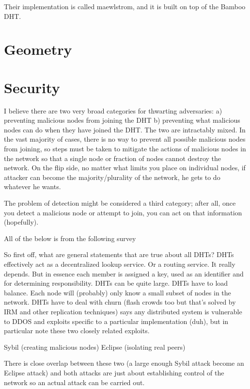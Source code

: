 \documentclass[10pt,letterpaper]{report}
\begin{document}
Their implementation is called maewlstrom, and it is built on top of the Bamboo DHT.



\section{Geometry}


\section{Security}

I believe there are two very broad categories for thwarting adversaries:  a)  preventing malicious nodes from joining the DHT b) preventing what malicious nodes can do when they have joined the DHT.  The two are intractably mixed.  In the vast majority of cases, there is no way to prevent all possible malicious nodes from joining, so steps must be taken to mitigate the actions of malicious nodes in the network so that a single node or fraction of nodes cannot destroy the network.  On the flip side, no matter what limits you place on individual nodes, if attacker can become the majority/plurality of the network, he gets to do whatever he wants.

The problem of detection might be considered a third category;  after all, once you detect a malicious node or attempt to join, you can act on that information (hopefully).

All of the below is from the following survey \cite{dhtsec}


So first off, what are general statements that are true about all DHTs?
DHTs  effectively act as a decentralized lookup service.  Or a routing service.  It really depends.  But in essence each member is assigned a key, used as an identifier and for determining responsibility.
DHTs can be quite large.
DHTs have to load balance.
Each node will (probably) only know a small subset of nodes in the network.
DHTs have to deal with churn (flash crowds too but that's solved by IRM and other replication techniques)
\cite{dhtsec} says any distributed system is vulnerable to DDOS and exploits specific to a particular implementation (duh), but in particular note these two closely related exploits. 

Sybil (creating malicious nodes)
Eclipse (isolating real peers)

There is close overlap between these two (a large enough Sybil attack become an Eclipse attack) and both attacks are just about establishing control of the network so an actual attack can be carried out.
\end{document}
